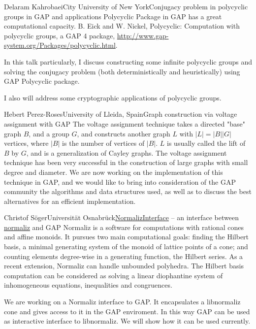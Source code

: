 \documentclass[12pt,a4paper]{article}
\begin{document}
\begin{Abstract}{Delaram Kahrobaei}{City University of New York}{Conjugacy problem in polycyclic groups in GAP and applications}
Polycyclic Package in GAP has a great computational capacity.
B. Eick and W. Nickel, Polycyclic: Computation with polycyclic groups, a GAP 4 package, \url{http://www.gap-system.org/Packages/polycyclic.html}.

In this talk particularly, I discuss constructing some infinite polycyclic groups and solving the conjugacy problem (both deterministically and heuristically) using GAP Polycyclic package. 

I also will address some cryptographic applications of polycyclic groups.
\end{Abstract}


\begin{Abstract}{Hebert Perez-Roses}{University of Lleida, Spain}{Graph construction via voltage assignment with GAP}
The voltage assignment technique takes a directed "base" graph $B$, and a
group $G$, and constructs another graph $L$ with $|L|=|B||G|$ vertices, where
$|B|$ is the number of vertices of $|B|$. $L$ is usually called the lift of $B$
by $G$, and is a generalization of Cayley graphs. The voltage assignment
technique has been very successful in the construction of large graphs
with small degree and diameter. We are now working on the implementation
of this technique in GAP, and we would like to bring into consideration
of the GAP community the algorithms and data structures used, as well as
to discuss the best alternatives for an efficient implementation.
\end{Abstract}


\begin{Abstract}{Christof Söger}{Universität Osnabrück}{\href{https://github.com/fingolfin/NormalizInterface}{NormalizInterface} -- an interface between \href{http://www.math.uos.de/normaliz}{normaliz} and GAP}
Normaliz is a software for computations with rational cones and affine
monoids. It pursues two main computational goals: finding the Hilbert
basis, a minimal generating system of the monoid of lattice points of a
cone; and counting elements degree-wise in a generating function, the
Hilbert series. As a recent extension, Normaliz can handle unbounded
polyhedra. The Hilbert basis computation can be considered as solving a
linear diophantine system of inhomogeneous equations, inequalities and
congruences.

We are working on a Normaliz interface to GAP. It encapsulates a
libnormaliz cone and gives access to it in the GAP enviroment. In this
way GAP can be used as interactive interface to libnormaliz. We will
show how it can be used currently.
\end{Abstract}
\end{document}
